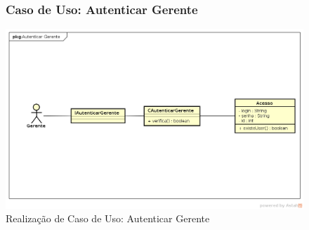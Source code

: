 \documentclass[
	12pt,				%
	openright,
	oneside,			%
	a4paper,			%
	chapter=TITLE,		%
	brazil				%
	]{abntex2}
\begin{document}
\begin{figure}[h!]

\subsubsection*{Caso de Uso: Autenticar Gerente}

	\caption{Realização de Caso de Uso: Autenticar Gerente}
	\begin{center}
	    \includegraphics[scale=0.5]{Arquivos/Projeto/R_autenticar_gerente}  
	\end{center}
\end{figure}





\end{document}
